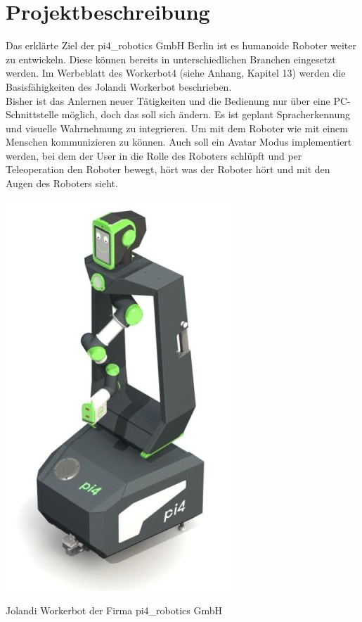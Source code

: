 \section{Projektbeschreibung}
Das erklärte Ziel der pi4\_robotics GmbH Berlin ist es humanoide Roboter weiter zu entwickeln. 
Diese können bereits in unterschiedlichen Branchen eingesetzt werden. Im Werbeblatt 
des Workerbot4 (siehe Anhang, Kapitel 13) werden die Basisfähigkeiten des Jolandi Workerbot beschrieben.  \\
Bisher ist das Anlernen neuer Tätigkeiten und die Bedienung nur über eine PC-Schnittstelle möglich, doch das soll sich ändern. Es ist geplant Spracherkennung und visuelle Wahrnehmung 
zu integrieren. Um mit dem Roboter wie mit einem Menschen kommunizieren zu können. Auch soll 
ein Avatar Modus implementiert werden, bei dem der User in die Rolle des Roboters schlüpft 
und per Teleoperation den Roboter bewegt, hört was der Roboter hört und mit den Augen des Roboters sieht. \\
\begin{minipage}{\textwidth}
    \begin{center}
        \includegraphics[scale=0.5]{img/jolandi.jpg} 
    \end{center}
\end{minipage}
\begin{center}
Jolandi Workerbot der Firma pi4\_robotics GmbH
\end{center}
 
